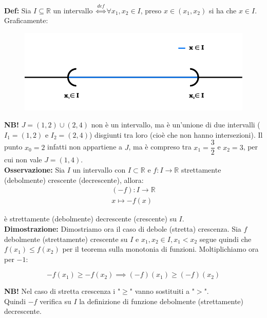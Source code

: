\documentclass{article}
\begin{document}
\noindent\textbf{Def:} Sia $I \subseteq \mathbb{R}$ un intervallo $\overset{def}{\iff} \forall x_1, x_2 \in I$, preso $x \in (x_1, x_2)$ si ha che $x \in I$. Graficamente:

\begin{figure}[!h]
    \centering
    \includegraphics[width=12cm]{./images/interval1.pdf}
\end{figure}

\noindent\textbf{NB!} $J = (1, 2) \cup (2, 4)$ non è un intervallo, ma è un'unione di due intervalli ($I_1 = (1, 2)$ e $I_2 = (2, 4)$) disgiunti tra loro (cioè che non hanno intersezioni). Il punto $x_0 = 2$ infatti non appartiene a $J$, ma è compreso tra $x_1 = \dfrac{3}{2}$ e $x_2 = 3$, per cui non vale $J = (1, 4)$.\\

\noindent\textbf{Osservazione:} Sia $I$ un intervallo con $I \subset \mathbb{R}$ e $f: I \xrightarrow{} \mathbb{R}$ strettamente (debolmente) crescente (decrescente), allora:
\begin{gather*}
    (-f): I \xrightarrow{} \mathbb{R}\\
    x \longmapsto - f(x)
\end{gather*}

\noindent è strettamente (debolmente) decrescente (crescente) su $I$.\\

\noindent\textbf{Dimostrazione:} Dimostriamo ora il caso di debole (stretta) crescenza. Sia $f$ debolmente (strettamente) crescente su $I$ e $x_1, x_2 \in I, x_1 < x_2$ segue quindi che $f(x_1) \leq f(x_2)$ per il teorema sulla monotonia di funzioni. Moltiplichiamo ora per $-1$:

\begin{equation*}
    -f(x_1) \geq - f(x_2) \implies  (-f)(x_1) \geq (-f)(x_2)
\end{equation*}

\noindent\textbf{NB!} Nel caso di stretta crescenza i "$\geq$" vanno sostituiti a "$>$".\\

\noindent Quindi $-f$ verifica su $I$ la definizione di funzione debolmente (strettamente) decrescente. \\
\end{document}
